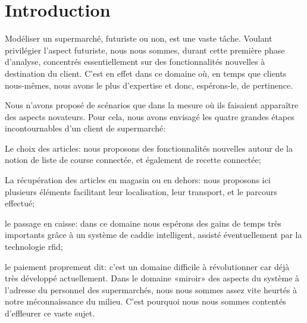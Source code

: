 \chapter{Introduction}

Modéliser un supermarché, futuriste ou non, est une vaste tâche.
Voulant privilégier l'aspect futuriste, nous nous sommes, durant cette première phase d'analyse, concentrés essentiellement sur des fonctionnalités nouvelles à destination du client.
C'est en effet dans ce domaine où, en temps que clients nous-mêmes, nous avons le plus d'expertise et donc, espérons-le, de pertinence.\par
Nous n'avons proposé de scénarios que dans la mesure où ils faisaient apparaître des aspects novateurs.
Pour cela, nous avons envisagé les quatre grandes étapes incontournables d'un client de supermarché:
\startitemize[n]
\item Le choix des articles: nous proposons des fonctionnalités nouvelles autour de la notion de liste de course connectée, et également de recette connectée;
\item La récupération des articles en magasin ou en dehors: nous proposons ici plusieurs éléments facilitant leur localisation, leur transport, et le parcours effectué;
\item le passage en caisse: dans ce domaine nous espérons des gains de temps très importants grâce à un système de caddie intelligent, assisté éventuellement par la technologie rfid;
\item le paiement proprement dit: c'est un domaine difficile à révolutionner car déjà très développé actuellement.
\stopitemize
\blank
Dans le domaine «miroir» des aspects du système à l'adresse du personnel des supermarchés, nous nous sommes assez vite heurtés à notre méconnaissance du milieu.
C'est pourquoi nous nous sommes contentés d'effleurer ce vaste sujet.

